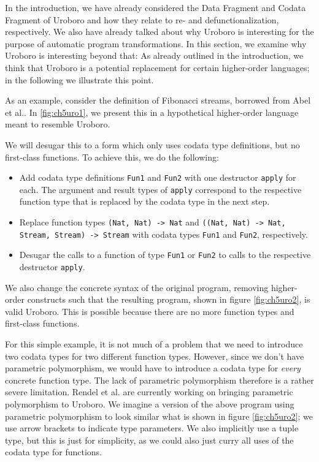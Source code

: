 In the introduction, we have already considered the Data Fragment and Codata Fragment of Uroboro and how they relate to re- and defunctionalization, respectively. We also have already talked about why Uroboro is interesting for the purpose of automatic program transformations. In this section, we examine why Uroboro is interesting beyond that: As already outlined in the introduction, we think that Uroboro is a potential replacement for certain higher-order languages; in the following we illustrate this point.

As an example, consider the definition of Fibonacci streams, borrowed from Abel et al.\cite{abel13copatterns}. In \autoref{fig:ch5uro1}, we present this in a hypothetical higher-order language meant to resemble Uroboro.

We will desugar this to a form which only uses codata type definitions, but no first-class functions. To achieve this, we do the following:
\begin{itemize}
\item Add codata type definitions \texttt{Fun1} and \texttt{Fun2} with one destructor \texttt{apply} for each. The argument and result types of \texttt{apply} correspond to the respective function type that is replaced by the codata type in the next step.

\item Replace function types \texttt{(Nat, Nat) -> Nat} and \texttt{((Nat, Nat) -> Nat, Stream, Stream) -> Stream} with codata types \texttt{Fun1} and \texttt{Fun2}, respectively.

\item Desugar the calls to a function of type \texttt{Fun1} or \texttt{Fun2} to calls to the respective destructor \texttt{apply}.
\end{itemize}
We also change the concrete syntax of the original program, removing higher-order constructs such that the resulting program, shown in figure \autoref{fig:ch5uro2}, is valid Uroboro. This is possible because there are no more function types and first-class functions.

For this simple example, it is not much of a problem that we need to introduce two codata types for two different function types. However, since we don't have parametric polymorphism, we would have to introduce a codata type for \textit{every} concrete function type. The lack of parametric polymorphism therefore is a rather severe limitation. Rendel et al. are currently working on bringing parametric polymorphism to Uroboro. We imagine a version of the above program using parametric polymorphism to look similar what is shown in figure \autoref{fig:ch5uro2}; we use arrow brackets to indicate type parameters. We also implicitly use a tuple type, but this is just for simplicity, as we could also just curry all uses of the codata type for functions.

